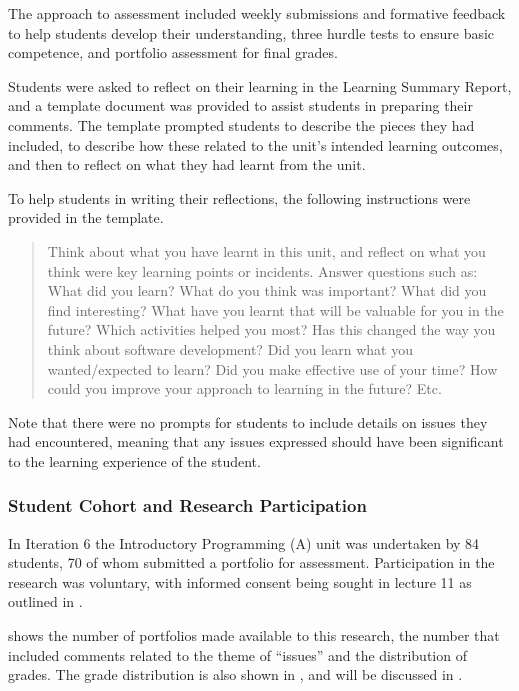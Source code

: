 The approach to assessment included weekly submissions and formative feedback to help students develop their understanding, three hurdle tests to ensure basic competence, and portfolio assessment for final grades.

Students were asked to reflect on their learning in the Learning Summary Report, and a template document was provided to assist students in preparing their comments. The template prompted students to describe the pieces they had included, to describe how these related to the unit's intended learning outcomes, and then to reflect on what they had learnt from the unit.

To help students in writing their reflections, the following instructions were provided in the template. 
\begin{quote}
  \small
  Think about what you have learnt in this unit, and reflect on what you think were key learning points or incidents. Answer questions such as: What did you learn? What do you think was important? What did you find interesting? What have you learnt that will be valuable for you in the future? Which activities helped you most? Has this changed the way you think about software development? Did you learn what you wanted/expected to learn? Did you make effective use of your time? How could you improve your approach to learning in the future? Etc. 
\end{quote}

Note that there were no prompts for students to include details on issues they had encountered, meaning that any issues expressed should have been significant to the learning experience of the student.

\subsubsection{Student Cohort and Research Participation} %
\label{sub:issues_student_cohort}

In Iteration 6 the Introductory Programming (A) unit was undertaken by 84 students, 70 of whom submitted a portfolio for assessment. Participation in the research was voluntary, with informed consent being sought in lecture 11 as outlined in .

 shows the number of portfolios made available to this research, the number that included comments related to the theme of ``issues'' and the distribution of grades. The grade distribution is also shown in , and will be discussed in .

